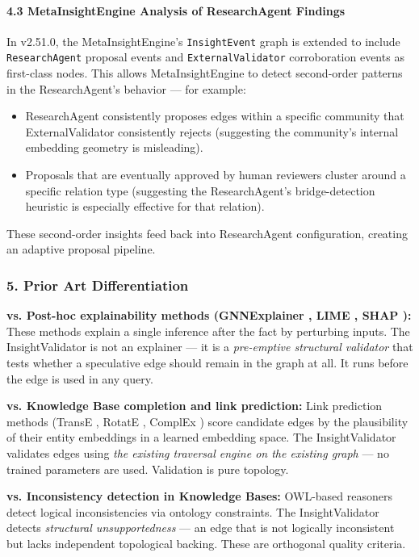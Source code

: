 \paragraph{4.3 MetaInsightEngine Analysis of ResearchAgent Findings}
In v2.51.0, the MetaInsightEngine's \texttt{InsightEvent} graph is extended to include \texttt{ResearchAgent} proposal events and \texttt{ExternalValidator} corro\-boration events as first-class nodes. This allows MetaInsightEngine to detect second-order patterns in the ResearchAgent's behavior — for example:

\begin{itemize}
\item ResearchAgent consi\-stently proposes edges within a specific community that ExternalValidator consi\-stently rejects (suggesting the community's internal embedding geometry is misleading).
\item Proposals that are eventually approved by human reviewers cluster around a specific relation type (suggesting the ResearchAgent's bridge-detection heuristic is especially effective for that relation).

\end{itemize}
These second-order insights feed back into ResearchAgent confi\-guration, creating an adaptive proposal pipeline.

\subsubsection{5. Prior Art Differ\-entiation}

\textbf{vs. Post-hoc expla\-inability methods (GNNExplainer \cite{ying2019gnnexplainer}, LIME \cite{ribeiro2016lime}, SHAP \cite{lundberg2017shap}):} These methods explain a single inference after the fact by perturbing inputs. The InsightValidator is not an explainer — it is a \textit{pre-emptive structural validator} that tests whether a speculative edge should remain in the graph at all. It runs before the edge is used in any query.

\textbf{vs. Knowledge Base completion and link prediction:} Link prediction methods (TransE \cite{bordes2013transe}, RotatE \cite{sun2019rotate}, ComplEx \cite{trouillon2016complex}) score candidate edges by the plaus\-ibility of their entity embeddings in a learned embedding space. The InsightValidator validates edges using \textit{the existing traversal engine on the existing graph} — no trained parameters are used. Validation is pure topology.

\textbf{vs. Incons\-istency detection in Knowledge Bases:} OWL-based reasoners \cite{horrocks2004owl} detect logical incon\-sistencies via ontology constraints. The InsightValidator detects \textit{structural unsup\-portedness} — an edge that is not logically incon\-sistent but lacks independent topological backing. These are orthogonal quality criteria.

